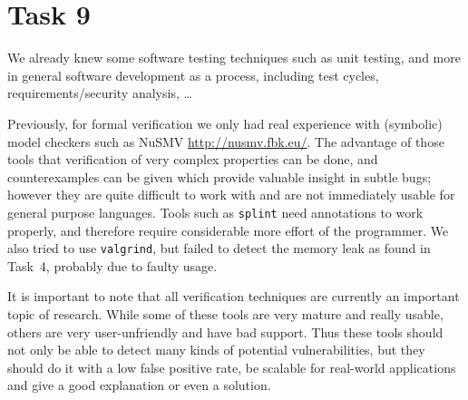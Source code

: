 \section*{Task 9}
We already knew some software testing techniques such as unit testing, and more in general software development as a process, including test cycles, requirements/security analysis, \ldots

Previously, for formal verification we only had real experience with (symbolic) model checkers such as NuSMV \url{http://nusmv.fbk.eu/}. The advantage of those tools that verification of very complex properties can be done, and counterexamples can be given which provide valuable insight in subtle bugs; however they are quite difficult to work with and are not immediately usable for general purpose languages. 
Tools such as \texttt{splint} need annotations to work properly, and therefore require considerable more effort of the programmer.
We also tried to use \texttt{valgrind}, but failed to detect the memory leak as found in Task~4, probably due to faulty usage.

It is important to note that all verification techniques are currently an important topic of research. While some of these tools are very mature and really usable, others are very user-unfriendly and have bad support. Thus these tools should not only be able to detect many kinds of potential vulnerabilities, but they should do it with a low false positive rate, be scalable for real-world applications and give a good explanation or even a solution.

